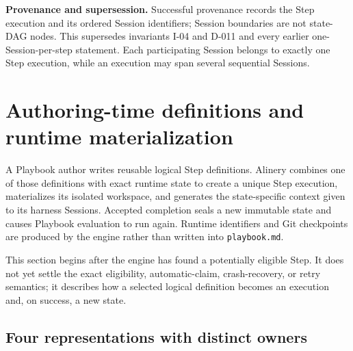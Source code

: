 \documentclass[11pt]{article}
\begin{document}
\noindent\textbf{Provenance and supersession.} Successful provenance records the Step execution and its ordered Session identifiers; Session boundaries are not state-DAG nodes. This supersedes invariants I-04 and D-011 and every earlier one-Session-per-step statement. Each participating Session belongs to exactly one Step execution, while an execution may span several sequential Sessions.

\clearpage
\section{Authoring-time definitions and runtime materialization}

\begin{summarybox}
A Playbook author writes reusable logical Step definitions. Alinery combines one
of those definitions with exact runtime state to create a unique Step execution,
materializes its isolated workspace, and generates the state-specific context
given to its harness Sessions. Accepted completion seals a new immutable state
and causes Playbook evaluation to run again. Runtime identifiers and Git
checkpoints are produced by the engine rather than written into
\texttt{playbook.md}.
\end{summarybox}

This section begins after the engine has found a potentially eligible Step. It
does not yet settle the exact eligibility, automatic-claim, crash-recovery, or
retry semantics; it describes how a selected logical definition becomes an
execution and, on success, a new state.

\subsection{Four representations with distinct owners}
\end{document}
